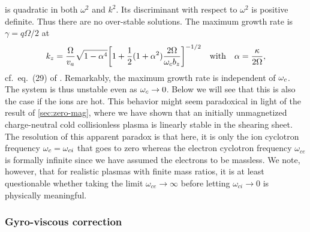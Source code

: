 \documentclass[aps,pre,notitlepage,amsmath,amssymb,amsfonts,nobibnotes,nofootinbib,superscriptaddress]{revtex4-1}
\begin{document}
 is quadratic in both $\omega^2$ and $k^2$. Its
discriminant with respect to $\omega^2$ is positive definite. Thus there are
no over-stable solutions. The maximum growth rate is $\gamma=q\Omega/2$ at
\begin{equation}
  k_z = \frac{\Omega}{\va}
  \sqrt{1 - \alpha^4}
  {\left[1 + \frac{1}{2}(1 + \alpha^2)\frac{2\Omega}{\omc b_z}\right]}^{-1/2}
  \quad\textrm{with}\quad
  \alpha = \frac{\kappa}{2\Omega},
\end{equation}
cf.\ eq.~(29) of \citet{Wardle1999}. Remarkably, the maximum growth rate is
independent of $\omega_c$. The system is thus unstable even as $\omega_c\to0$. Below
we will see that this is also the case if the ions are hot. This behavior
might seem paradoxical in light of the result of \cref{sec:zero-mag}, where we
have shown that an initially unmagnetized charge-neutral cold collisionless
plasma is linearly stable in the shearing sheet. The resolution of this
apparent paradox is that here, it is only the ion cyclotron frequency
$\omega_c=\omega_{ci}$ that goes to zero whereas the electron cyclotron frequency
$\omega_{ce}$ is formally infinite since we have assumed the electrons to be
massless. We note, however, that for realistic plasmas with finite mass
ratios, it is at least questionable whether taking the limit
$\omega_{ce}\to\infty$ before letting $\omega_{ci}\to{}0$ is physically
meaningful.

\subsubsection{Gyro-viscous correction}
\label{sec:gyro-viscous}
\end{document}
